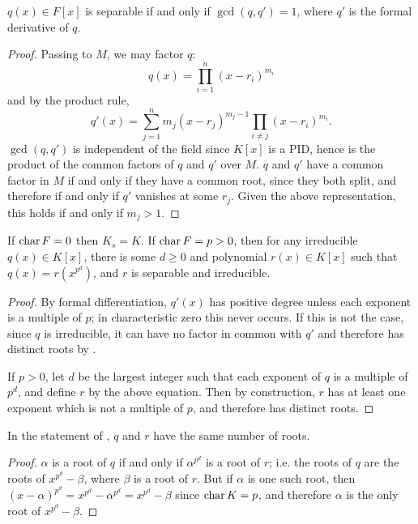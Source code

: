 \begin{lemma} $q(x) \in F[x]$ is separable if and only if $\gcd(q, q') = 1$,
where $q'$ is the formal derivative of $q$. 
\label{der_poly}
\end{lemma}

\begin{proof} Passing to $M$, we may factor $q$:
\begin{equation*}
q(x) = \prod_{i = 1}^n (x - r_i)^{m_i}
\end{equation*}
and by the product rule,
\begin{equation*}
q'(x) = \sum_{j = 1}^n m_j (x - r_j)^{m_j - 1} \prod_{i \neq j} (x -
	r_i)^{m_i}.
\end{equation*}
$\gcd(q, q')$ is independent of the field since $K[x]$ is a PID, hence is the
product of the common factors of $q$ and $q'$ over $M$.  $q$ and $q'$ have a
common factor in $M$ if and only if they have a common root, since they both
split, and therefore if and only if $q'$ vanishes at some $r_j$.  Given the
above representation, this holds if and only if $m_j > 1$. \end{proof}

\begin{lemma} If $\operatorname{\text{char}}{F} = 0$ then $K_s = K$.  If $\operatorname{\text{char}}{F} = p > 0$, then for
any irreducible $q(x) \in K[x]$, there is some $d \geq 0$ and polynomial $r(x)
\in K[x]$ such that $q(x) = r(x^{p^d})$, and $r$ is separable and irreducible.
\label{sep_poly}
\end{lemma}

\begin{proof} By formal differentiation, $q'(x)$ has positive degree unless
each exponent is a multiple of $p$; in characteristic zero this never occurs.
If this is not the case, since $q$ is irreducible, it can have no factor in
common with $q'$ and therefore has distinct roots by .

If $p > 0$, let $d$ be the largest integer such that each exponent of $q$ is a
multiple of $p^d$, and define $r$ by the above equation.  Then by
construction, $r$ has at least one exponent which is not a multiple of $p$,
and therefore has distinct roots. \end{proof}

\begin{corollary} In the statement of , $q$ and $r$ have the same
number of roots.
\label{sep_roots}
\end{corollary}

\begin{proof} $\alpha$ is a root of $q$ if and only if $\alpha^{p^d}$ is a
root of $r$; i.e. the roots of $q$ are the roots of $x^{p^d} - \beta$, where
$\beta$ is a root of $r$.  But if $\alpha$ is one such root, then $(x -
\alpha)^{p^d} = x^{p^d} - \alpha^{p^d} = x^{p^d} - \beta$ since $\operatorname{\text{char}}{K} =
p$, and therefore $\alpha$ is the only root of $x^{p^d} - \beta$. \end{proof}

